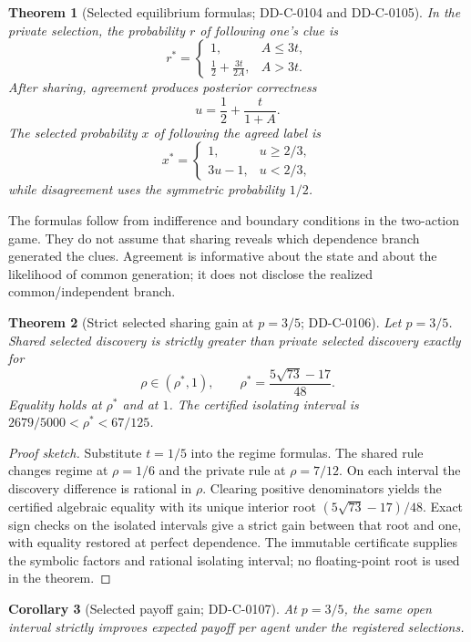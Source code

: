 \documentclass[12pt]{article}
\newtheorem{theorem}{Theorem}
\newtheorem{corollary}[theorem]{Corollary}
\theoremstyle{definition}
\begin{document}
\begin{theorem}[Selected equilibrium formulas; DD-C-0104 and DD-C-0105]
In the private selection, the probability $r$ of following one's clue is
\[
 r^*=\begin{cases}
 1,&A\leq3t,\\[2pt]
 \frac12+\frac{3t}{2A},&A>3t.
 \end{cases}
\]
After sharing, agreement produces posterior correctness
\[
 u=\frac12+\frac{t}{1+A}.
\]
The selected probability $x$ of following the agreed label is
\[
 x^*=\begin{cases}
 1,&u\geq2/3,\\
 3u-1,&u<2/3,
 \end{cases}
\]
while disagreement uses the symmetric probability $1/2$.
\end{theorem}

The formulas follow from indifference and boundary conditions in the two-action
game. They do not assume that sharing reveals which dependence branch generated
the clues. Agreement is informative about the state and about the likelihood of
common generation; it does not disclose the realized common/independent branch.



\begin{theorem}[Strict selected sharing gain at $p=3/5$; DD-C-0106]
Let $p=3/5$. Shared selected discovery is strictly greater than private selected
discovery exactly for
\[
 \rho\in(\rho^*,1),\qquad
 \rho^*=\frac{5\sqrt{73}-17}{48}.
\]
Equality holds at $\rho^*$ and at $1$. The certified isolating interval is
$2679/5000<\rho^*<67/125$.
\end{theorem}

\begin{proof}[Proof sketch]
Substitute $t=1/5$ into the regime formulas. The shared rule changes regime at
$\rho=1/6$ and the private rule at $\rho=7/12$. On each interval the discovery
difference is rational in $\rho$. Clearing positive denominators yields the
certified algebraic equality with its unique interior root
$(5\sqrt{73}-17)/48$. Exact sign checks on the isolated intervals give a strict
gain between that root and one, with equality restored at perfect dependence.
The immutable certificate supplies the symbolic factors and rational isolating
interval; no floating-point root is used in the theorem.
\end{proof}

\begin{corollary}[Selected payoff gain; DD-C-0107]
At $p=3/5$, the same open interval strictly improves expected payoff per agent
under the registered selections.
\end{corollary}
\end{document}
